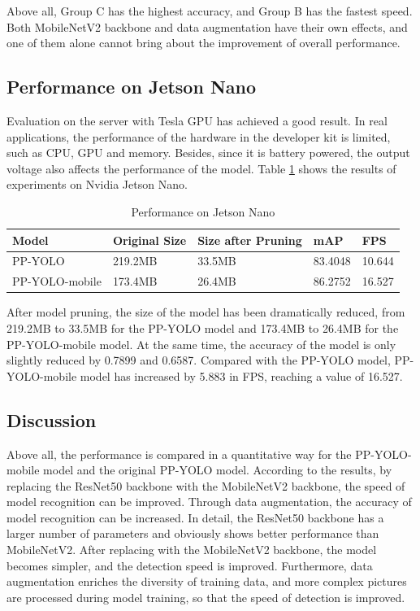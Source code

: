 \documentclass[sensors,article,submit,moreauthors,pdftex]{Definitions/mdpi}
\begin{document}
Above all, Group C has the highest accuracy, and Group B has the fastest speed. Both MobileNetV2 backbone and data augmentation have their own effects, and one of them alone cannot bring about the improvement of overall performance.


\subsection{Performance on Jetson Nano}
Evaluation on the server with Tesla GPU has achieved a good result. In real applications, the performance of the hardware in the developer kit is limited, such as CPU, GPU and memory. Besides, since it is battery powered, the output voltage also affects the performance of the model. Table \ref{tbl:performance on Jetson Nano} shows the results of experiments on Nvidia Jetson Nano.


\begin{table}[htbp]
\centering
\caption{Performance on Jetson Nano}
\begin{tabular}{lllll} 
\toprule
\textbf{Model}&\textbf{Original Size}&\textbf{Size after Pruning}&\textbf{mAP}&\textbf{FPS}\\
\midrule
PP-YOLO  & 219.2MB&33.5MB&83.4048&10.644\\
PP-YOLO-mobile &173.4MB & 26.4MB&86.2752&16.527\\
\bottomrule
\end{tabular}
\label{tbl:performance on Jetson Nano}
\end{table}


After model pruning, the size of the model has been dramatically reduced, from 219.2MB to 33.5MB for the PP-YOLO model and 173.4MB to 26.4MB for the PP-YOLO-mobile model. At the same time, the accuracy of the model is only slightly reduced by 0.7899 and 0.6587. Compared with the PP-YOLO model, PP-YOLO-mobile model has increased by 5.883 in FPS, reaching a value of 16.527.



\subsection{Discussion}
Above all, the performance is compared in a quantitative way for the PP-YOLO-mobile model and the original PP-YOLO model. According to the results, by replacing the ResNet50 backbone with the MobileNetV2 backbone, the speed of model recognition can be improved. Through data augmentation, the accuracy of model recognition can be increased. In detail, the ResNet50 backbone has a larger number of parameters and obviously shows better performance than MobileNetV2. After replacing with the MobileNetV2 backbone, the model becomes simpler, and the detection speed is improved. Furthermore, data augmentation enriches the diversity of training data, and more complex pictures are processed during model training, so that the speed of detection is improved.
\end{document}
